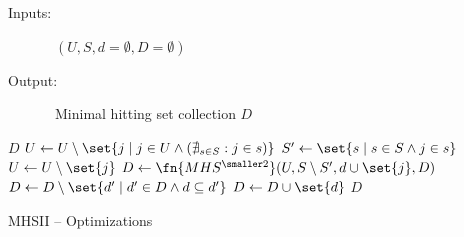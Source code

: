 \begin{algorithm}
  \begin{description}
  \item[Inputs:]\ $(U, S, d=\emptyset, D=\emptyset)$
  \item[Output:]\ Minimal hitting set collection $D$
  \end{description}

  \begin{algorithmic}[1]
      \label{alg:mhs2o:opt3.1}
    \CSTATE \Return $D$ \label{alg:mhs2o:opt3.2}
    \EndIf
     \label{alg:mhs2o:divide}
    \CSTATE $U \gets U \setminus \set{j \mid j \in U \wedge (\nexists_{s \in S}: j\in s)}$  \label{alg:mhs2o:opt2}
     \label{alg:mhs2o:rank}
    \State $S^\prime \gets \set{s \mid s \in S \wedge j \in s}$ \label{alg:mhs2o:S'}
    \CSTATE $U \gets U \setminus \set{j}$    \label{alg:mhs2o:opt1}
    \State $D \gets \fn{MHS^\text{\smaller2}}(U, S \setminus S^\prime, d \cup \set{j}, D)$
    \EndFor
    \Else
     \label{alg:mhs2o:isminimal}
    \State $D \gets D \setminus \set{d^\prime \mid d^\prime \in D \wedge  d \subseteq d^\prime}$ \label{alg:mhs2o:purge}
    \State $D \gets D \cup \set{d}$ \label{alg:mhs2o:addD}
    \EndIf
    \EndIf
    \State \Return $D$
  \end{algorithmic}
  \caption{\acs{MHSII} -- Optimizations}
  \label{alg:mhs2o}
\end{algorithm}

